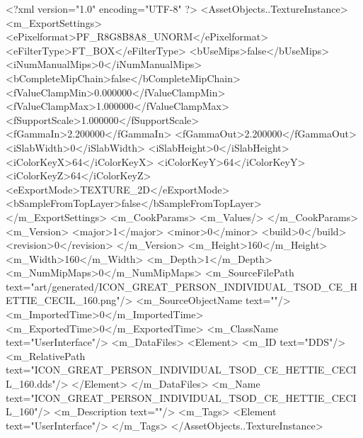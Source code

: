 <?xml version="1.0" encoding="UTF-8" ?>
<AssetObjects..TextureInstance>
	<m_ExportSettings>
		<ePixelformat>PF_R8G8B8A8_UNORM</ePixelformat>
		<eFilterType>FT_BOX</eFilterType>
		<bUseMips>false</bUseMips>
		<iNumManualMips>0</iNumManualMips>
		<bCompleteMipChain>false</bCompleteMipChain>
		<fValueClampMin>0.000000</fValueClampMin>
		<fValueClampMax>1.000000</fValueClampMax>
		<fSupportScale>1.000000</fSupportScale>
		<fGammaIn>2.200000</fGammaIn>
		<fGammaOut>2.200000</fGammaOut>
		<iSlabWidth>0</iSlabWidth>
		<iSlabHeight>0</iSlabHeight>
		<iColorKeyX>64</iColorKeyX>
		<iColorKeyY>64</iColorKeyY>
		<iColorKeyZ>64</iColorKeyZ>
		<eExportMode>TEXTURE_2D</eExportMode>
		<bSampleFromTopLayer>false</bSampleFromTopLayer>
	</m_ExportSettings>
	<m_CookParams>
		<m_Values/>
	</m_CookParams>
	<m_Version>
		<major>1</major>
		<minor>0</minor>
		<build>0</build>
		<revision>0</revision>
	</m_Version>
	<m_Height>160</m_Height>
	<m_Width>160</m_Width>
	<m_Depth>1</m_Depth>
	<m_NumMipMaps>0</m_NumMipMaps>
	<m_SourceFilePath text="art/generated/ICON_GREAT_PERSON_INDIVIDUAL_TSOD_CE_HETTIE_CECIL_160.png"/>
	<m_SourceObjectName text=""/>
	<m_ImportedTime>0</m_ImportedTime>
	<m_ExportedTime>0</m_ExportedTime>
	<m_ClassName text="UserInterface"/>
	<m_DataFiles>
		<Element>
			<m_ID text="DDS"/>
			<m_RelativePath text="ICON_GREAT_PERSON_INDIVIDUAL_TSOD_CE_HETTIE_CECIL_160.dds"/>
		</Element>
	</m_DataFiles>
	<m_Name text="ICON_GREAT_PERSON_INDIVIDUAL_TSOD_CE_HETTIE_CECIL_160"/>
	<m_Description text=""/>
	<m_Tags>
		<Element text="UserInterface"/>
	</m_Tags>
</AssetObjects..TextureInstance>
